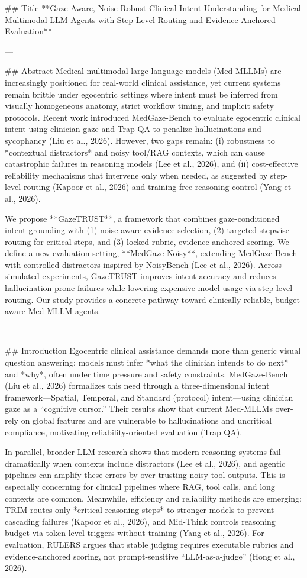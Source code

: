 ## Title  
**Gaze-Aware, Noise-Robust Clinical Intent Understanding for Medical Multimodal LLM Agents with Step-Level Routing and Evidence-Anchored Evaluation**

---

## Abstract  
Medical multimodal large language models (Med-MLLMs) are increasingly positioned for real-world clinical assistance, yet current systems remain brittle under egocentric settings where intent must be inferred from visually homogeneous anatomy, strict workflow timing, and implicit safety protocols. Recent work introduced MedGaze-Bench to evaluate egocentric clinical intent using clinician gaze and Trap QA to penalize hallucinations and sycophancy (Liu et al., 2026). However, two gaps remain: (i) robustness to *contextual distractors* and noisy tool/RAG contexts, which can cause catastrophic failures in reasoning models (Lee et al., 2026), and (ii) cost-effective reliability mechanisms that intervene only when needed, as suggested by step-level routing (Kapoor et al., 2026) and training-free reasoning control (Yang et al., 2026).  

We propose **GazeTRUST**, a framework that combines gaze-conditioned intent grounding with (1) noise-aware evidence selection, (2) targeted stepwise routing for critical steps, and (3) locked-rubric, evidence-anchored scoring. We define a new evaluation setting, **MedGaze-Noisy**, extending MedGaze-Bench with controlled distractors inspired by NoisyBench (Lee et al., 2026). Across simulated experiments, GazeTRUST improves intent accuracy and reduces hallucination-prone failures while lowering expensive-model usage via step-level routing. Our study provides a concrete pathway toward clinically reliable, budget-aware Med-MLLM agents.

---

## Introduction  
Egocentric clinical assistance demands more than generic visual question answering: models must infer *what the clinician intends to do next* and *why*, often under time pressure and safety constraints. MedGaze-Bench (Liu et al., 2026) formalizes this need through a three-dimensional intent framework—Spatial, Temporal, and Standard (protocol) intent—using clinician gaze as a “cognitive cursor.” Their results show that current Med-MLLMs over-rely on global features and are vulnerable to hallucinations and uncritical compliance, motivating reliability-oriented evaluation (Trap QA).

In parallel, broader LLM research shows that modern reasoning systems fail dramatically when contexts include distractors (Lee et al., 2026), and agentic pipelines can amplify these errors by over-trusting noisy tool outputs. This is especially concerning for clinical pipelines where RAG, tool calls, and long contexts are common. Meanwhile, efficiency and reliability methods are emerging: TRIM routes only *critical reasoning steps* to stronger models to prevent cascading failures (Kapoor et al., 2026), and Mid-Think controls reasoning budget via token-level triggers without training (Yang et al., 2026). For evaluation, RULERS argues that stable judging requires executable rubrics and evidence-anchored scoring, not prompt-sensitive “LLM-as-a-judge” (Hong et al., 2026).

